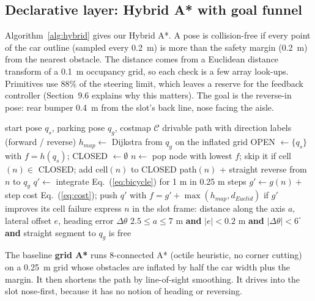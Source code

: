 \documentclass[12pt,a4paper]{article}
\begin{document}
\subsection{Declarative layer: Hybrid A* with goal funnel}
Algorithm~\ref{alg:hybrid} gives our Hybrid A*. A pose is collision-free if every point of the car outline (sampled every 0.2~m) is more than the safety margin (0.2~m) from the nearest obstacle. The distance comes from a Euclidean distance transform of a 0.1~m occupancy grid, so each check is a few array look-ups. Primitives use 88\% of the steering limit, which leaves a reserve for the feedback controller (Section~9.6 explains why this matters). The goal is the reverse-in pose: rear bumper 0.4~m from the slot's back line, nose facing the aisle.

\begin{algorithm}[H]
\caption{Hybrid A* with slot goal funnel}
\label{alg:hybrid}
\begin{algorithmic}[1]
\Require start pose $q_s$, parking pose $q_g$, costmap $\mathcal{C}$
\Ensure drivable path with direction labels (forward / reverse)
\State $h_{map} \gets$ Dijkstra from $q_g$ on the inflated grid 
\State OPEN $\gets \{q_s\}$ with $f = h(q_s)$; CLOSED $\gets \emptyset$
  \State $n \gets$ pop node with lowest $f$; skip it if cell$(n) \in$ CLOSED; add cell$(n)$ to CLOSED
   
     \State \Return path$(n)$ + straight reverse from $n$ to $q_g$
  \EndIf
     \State $q' \gets$ integrate Eq.~(\ref{eq:bicycle}) for 1 m in 0.25 m steps
        \State $g' \gets g(n) +$ step cost Eq.~(\ref{eq:cost}); push $q'$ with $f = g' + \max(h_{map}, d_{Euclid})$ if $g'$ improves its cell
     \EndIf
  \EndFor
\EndWhile
\State \Return failure 
\Statex
{}
  \State express $n$ in the slot frame: distance along the axis $a$, lateral offset $e$, heading error $\Delta\theta$
  \State \Return $2.5 \le a \le 7$ m \textbf{and} $|e| < 0.2$ m \textbf{and} $|\Delta\theta| < 6^\circ$ \textbf{and} straight segment to $q_g$ is free
\EndFunction
\end{algorithmic}
\end{algorithm}

The baseline \textbf{grid A*} runs 8-connected A* (octile heuristic, no corner cutting) on a 0.25~m grid whose obstacles are inflated by half the car width plus the margin. It then shortens the path by line-of-sight smoothing. It drives into the slot nose-first, because it has no notion of heading or reversing.
\end{document}
